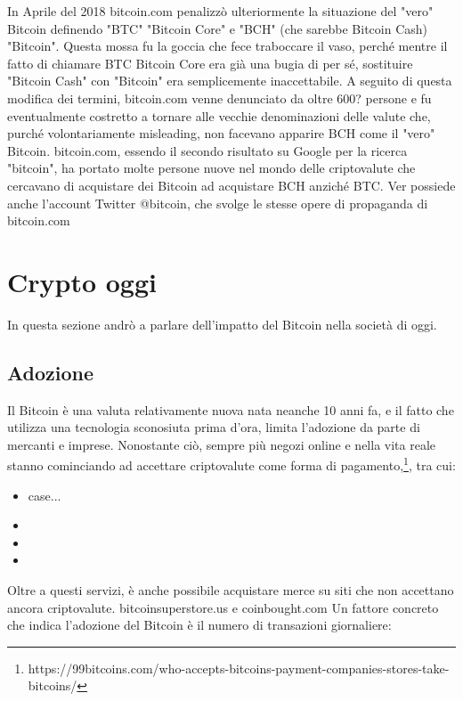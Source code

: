 \documentclass {article}
\begin{document}
{In Aprile del 2018 bitcoin.com penalizzò ulteriormente la situazione del "vero" Bitcoin definendo "BTC" "Bitcoin Core" e "BCH" (che sarebbe Bitcoin Cash) "Bitcoin".
Questa mossa fu la goccia che fece traboccare il vaso, perché mentre il fatto di chiamare BTC Bitcoin Core era già una bugia di per sé, sostituire "Bitcoin Cash" con "Bitcoin" era semplicemente inaccettabile.
A seguito di questa modifica dei termini, bitcoin.com venne denunciato da oltre 600? persone e fu eventualmente costretto a tornare alle vecchie denominazioni delle valute che, purché volontariamente misleading, non facevano apparire BCH come il "vero" Bitcoin.
bitcoin.com, essendo il secondo risultato su Google per la ricerca "bitcoin", ha portato molte persone nuove nel mondo delle criptovalute che cercavano di acquistare dei Bitcoin ad acquistare BCH anziché BTC.
Ver possiede anche l'account Twitter @bitcoin, che svolge le stesse opere di propaganda di bitcoin.com


\section {Crypto oggi}


In questa sezione andrò a parlare dell'impatto del Bitcoin nella società di oggi.


\subsection {Adozione}


Il Bitcoin è una valuta relativamente nuova nata neanche 10 anni fa, e il fatto che utilizza una tecnologia sconosiuta prima d'ora, limita l'adozione da parte di mercanti e imprese.
Nonostante ciò, sempre più negozi online e nella vita reale stanno cominciando ad accettare criptovalute come forma di pagamento,\footnote{https://99bitcoins.com/who-accepts-bitcoins-payment-companies-stores-take-bitcoins/}, tra cui:

\begin{itemize}
\item case...
\item 
\item 
\item 
\end{itemize}
Oltre a questi servizi, è anche possibile acquistare merce su siti che non accettano ancora criptovalute. bitcoinsuperstore.us e coinbought.com
Un fattore concreto che indica l'adozione del Bitcoin è il numero di transazioni giornaliere:

}
\end{document}
